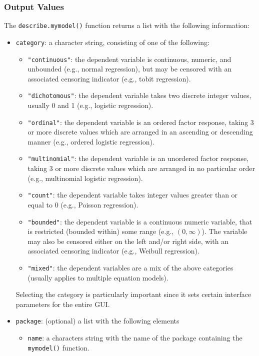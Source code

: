 \subsubsection{Output Values}
The {\tt describe.mymodel()} function returns a list with the
following information:  
\begin{itemize}
\item {\tt category}: a character string, consisting of one of the
following: 
\begin{itemize}
\item {\tt "continuous"}: the dependent variable is continuous, numeric, and
unbounded (e.g., normal regression), but may be censored with an associated censoring 
indicator (e.g., tobit regression).  
\item {\tt "dichotomous"}: the dependent variable takes two discrete integer
values, usually 0 and 1 (e.g., logistic regression).  
\item {\tt "ordinal"}: the dependent variable is an ordered factor
response, taking 3 or more discrete values which are arranged in an
ascending or descending manner (e.g., ordered logistic regression).  
\item {\tt "multinomial"}: the dependent variable is an unordered
factor response, taking 3 or more discrete values which are arranged
in no particular order (e.g., multinomial logistic regression).  
\item {\tt "count"}: the dependent variable takes integer values
greater than or equal to 0 (e.g., Poisson regression).  
\item {\tt "bounded"}: the dependent variable is a continuous numeric variable, that 
is restricted (bounded within) some range (e.g., $(0, \infty)$).  The variable may 
also be censored either on the left and/or right side, with an associated censoring 
indicator (e.g., Weibull regression).
\item {\tt "mixed"}: the dependent variables are a mix of the above
categories (usually applies to multiple equation models).  
\end{itemize}
Selecting the category is particularly important since it sets certain
interface parameters for the entire GUI.

\item {\tt package}: (optional) a list with the following elements

  \begin{itemize} 

   \item {\tt name}: a characters string with the name of the package
   containing the {\tt mymodel()} function.


\end{itemize}
\end{itemize}
